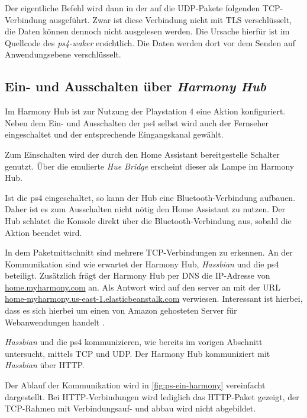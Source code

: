 



Der eigentliche Befehl wird dann in der auf die UDP-Pakete folgenden TCP-Verbindung ausgeführt.
Zwar ist diese Verbindung nicht mit TLS verschlüsselt, die Daten können dennoch nicht ausgelesen werden.
Die Ursache hierfür ist im Quellcode des \textit{ps4-waker} ersichtlich.
Die Daten werden dort vor dem Senden auf Anwendungsebene verschlüsselt.

\subsection{Ein- und Ausschalten über \textit{Harmony Hub}}
Im Harmony Hub ist zur Nutzung der Playstation 4 eine Aktion konfiguriert.
Neben dem Ein- und Ausschalten der \ac{ps4} selbst wird auch der Fernseher eingeschaltet und der entsprechende Eingangskanal gewählt.

Zum Einschalten wird der durch den Home Assistant bereitgestelle Schalter genutzt. Über die emulierte \textit{Hue Bridge} erscheint dieser als Lampe im Harmony Hub.

Ist die \ac{ps4} eingeschaltet, so kann der Hub eine Bluetooth-Verbindung aufbauen. Daher ist es zum Ausschalten nicht nötig den Home Assistant zu nutzen.
Der Hub schlatet die Konsole direkt über die Bluetooth-Verbindung aus, sobald die Aktion beendet wird.

In dem Paketmittschnitt sind mehrere TCP-Verbindungen zu erkennen.
An der Kommunikation sind wie erwartet der Harmony Hub, \textit{Hassbian} und die \ac{ps4} beteiligt.
Zusätzlich frägt der Harmony Hub per DNS die IP-Adresse von \url{home.myharmony.com} an.
Als Antwort wird auf den server an mit der URL \url{home-myharmony.us-east-1.elasticbeanstalk.com} verwiesen.
Interessant ist hierbei,
dass es sich hierbei um einen von Amazon gehosteten Server für Webanwendungen handelt \cite{AWSElast48:online}.

\textit{Hassbian} und die \ac{ps4} kommunizieren, wie bereits im vorigen Abschnitt untersucht, mittels TCP und UDP.
Der Harmony Hub kommuniziert mit \textit{Hassbian} über HTTP.

Der Ablauf der Kommunikation wird in \autoref{fig:ps-ein-harmony} vereinfacht dargestellt.
Bei HTTP-Verbindungen wird lediglich das HTTP-Paket gezeigt, der TCP-Rahmen mit Verbindungsauf- und abbau wird nicht abgebildet.

